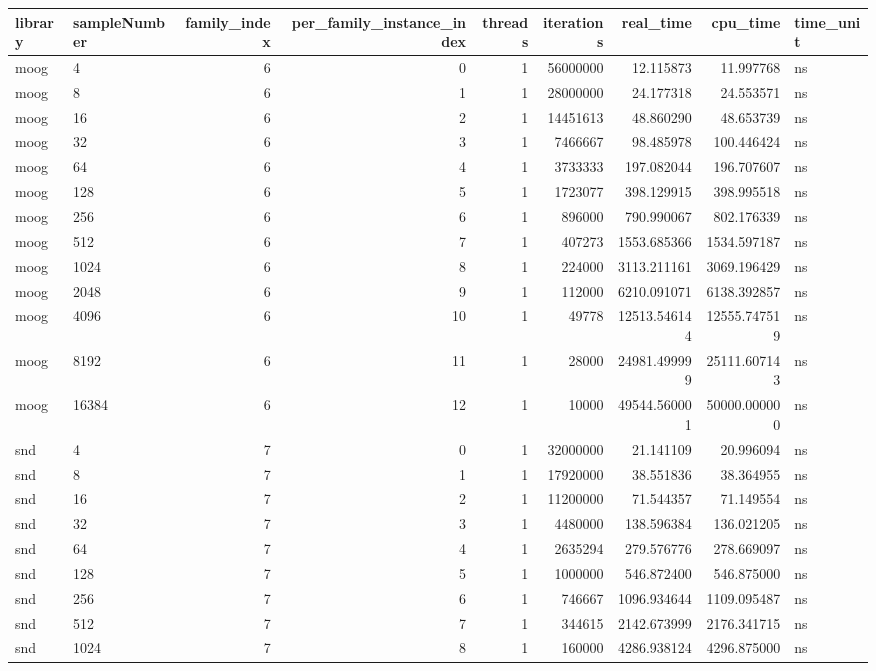 \begin{tabular}{llrrrrrrl}
\toprule
library & sampleNumber & family\_index & per\_family\_instance\_index & threads & iterations & real\_time & cpu\_time & time\_unit \\
\midrule
moog & 4 & 6 & 0 & 1 & 56000000 & 12.115873 & 11.997768 & ns \\
moog & 8 & 6 & 1 & 1 & 28000000 & 24.177318 & 24.553571 & ns \\
moog & 16 & 6 & 2 & 1 & 14451613 & 48.860290 & 48.653739 & ns \\
moog & 32 & 6 & 3 & 1 & 7466667 & 98.485978 & 100.446424 & ns \\
moog & 64 & 6 & 4 & 1 & 3733333 & 197.082044 & 196.707607 & ns \\
moog & 128 & 6 & 5 & 1 & 1723077 & 398.129915 & 398.995518 & ns \\
moog & 256 & 6 & 6 & 1 & 896000 & 790.990067 & 802.176339 & ns \\
moog & 512 & 6 & 7 & 1 & 407273 & 1553.685366 & 1534.597187 & ns \\
moog & 1024 & 6 & 8 & 1 & 224000 & 3113.211161 & 3069.196429 & ns \\
moog & 2048 & 6 & 9 & 1 & 112000 & 6210.091071 & 6138.392857 & ns \\
moog & 4096 & 6 & 10 & 1 & 49778 & 12513.546144 & 12555.747519 & ns \\
moog & 8192 & 6 & 11 & 1 & 28000 & 24981.499999 & 25111.607143 & ns \\
moog & 16384 & 6 & 12 & 1 & 10000 & 49544.560001 & 50000.000000 & ns \\
snd & 4 & 7 & 0 & 1 & 32000000 & 21.141109 & 20.996094 & ns \\
snd & 8 & 7 & 1 & 1 & 17920000 & 38.551836 & 38.364955 & ns \\
snd & 16 & 7 & 2 & 1 & 11200000 & 71.544357 & 71.149554 & ns \\
snd & 32 & 7 & 3 & 1 & 4480000 & 138.596384 & 136.021205 & ns \\
snd & 64 & 7 & 4 & 1 & 2635294 & 279.576776 & 278.669097 & ns \\
snd & 128 & 7 & 5 & 1 & 1000000 & 546.872400 & 546.875000 & ns \\
snd & 256 & 7 & 6 & 1 & 746667 & 1096.934644 & 1109.095487 & ns \\
snd & 512 & 7 & 7 & 1 & 344615 & 2142.673999 & 2176.341715 & ns \\
snd & 1024 & 7 & 8 & 1 & 160000 & 4286.938124 & 4296.875000 & ns \\

\end{tabular}
